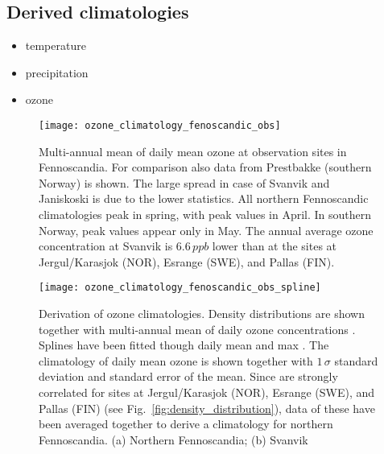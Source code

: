 \documentclass[bg, manuscript]{copernicus}
\begin{document}
\subsection{Derived climatologies}
\begin{itemize}
\item temperature
\item precipitation
\item ozone
\end{itemize}

\begin{figure}[t]
  \texttt{[image: ozone\_climatology\_fenoscandic\_obs]}
  \caption{Multi-annual mean of daily mean ozone at observation sites in Fennoscandia. For comparison also data from Prestbakke (southern Norway) is shown. The large spread in case of Svanvik and Janiskoski is due to the lower statistics. All northern Fennoscandic climatologies peak in spring, with peak values in April. In southern Norway, peak values appear only in May. The annual average ozone concentration \chem{\left<[O_3]\right>} at Svanvik is $6.6\,\unit{ppb}$ lower than at the sites at Jergul/Karasjok (NOR), Esrange (SWE), and Pallas (FIN).}
  \label{fig:ozone_climatology_fenoscandic_obs}
\end{figure}


\begin{figure}[t]
  \texttt{[image: ozone\_climatology\_fenoscandic\_obs\_spline]}
  \caption{Derivation of ozone climatologies. Density distributions are shown together with multi-annual mean of daily ozone concentrations \chem{[O_3]}. Splines have been fitted though daily mean and max \chem{[O_3]}. The climatology of daily mean ozone is shown together with $1\,\sigma$ standard deviation and standard error of the mean. Since \chem{[O_3]} are strongly correlated for sites at Jergul/Karasjok (NOR), Esrange (SWE), and Pallas (FIN) (see Fig.~\ref{fig:density_distribution}), data of these have been averaged together to derive a climatology for northern Fennoscandia. (a) Northern Fennoscandia; (b) Svanvik}
  \label{fig:ozone_climatology_fenoscandic_obs_spline}
\end{figure}
\end{document}
